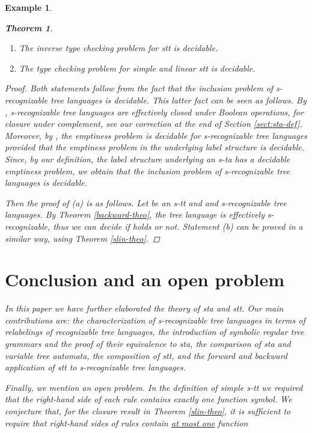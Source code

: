 \documentclass[10pt]{scrartcl}
\newtheorem{ex}[df]{Example}
\newtheorem{theo}[df]{Theorem}
\begin{document}
\begin{ex}
\begin{theo}
\begin{enumerate}
\item[(a)] The inverse type checking problem for stt is decidable.
\item[(b)] The type checking problem for simple and linear stt is decidable. 
\end{enumerate}
\end{theo}
\begin{proof}Both statements follow from the fact that the inclusion problem of s-recognizable tree languages is decidable. This latter fact can be seen as follows. By \cite[Thm. 3]{veabjo11a}, s-recognizable tree languages are effectively closed under Boolean operations, for closure under complement, see our correction at the end of Section \ref{sect:sta-def}. Moreover, by \cite[Thm. 4]{veabjo11a}, the emptiness problem is decidable for s-recognizable tree languages provided that the emptiness problem in the underlying label structure is decidable. Since, by our definition, the label structure underlying an s-ta has a decidable emptiness problem, we obtain that the inclusion problem of s-recognizable tree languages is decidable.

Then the proof of (a) is as follows. Let  be an s-tt and  and  s-recognizable tree languages.  By Theorem \ref{backward-theo},  the tree language   is effectively s-recognizable, thus we can decide if
 holds or not. Statement (b) can be proved in a similar way, using Theorem \ref{slin-theo}.
\end{proof} 





\section{Conclusion and an open problem}


In this paper we have further elaborated the theory of sta and stt. Our main contributions are: the characterization of s-recognizable tree languages in terms of relabelings of recognizable tree languages, the introduction of symbolic regular tree grammars and the proof of their equivalence to sta, the comparison of sta and variable tree automata, the composition of stt, and the forward and backward application of stt to s-recognizable tree languages.

Finally, we  mention an open problem.
In the definition of simple s-tt we required that the right-hand side of each rule contains exactly one function symbol. We conjecture that, for the closure result in Theorem \ref{slin-theo}, it is sufficient to require that right-hand sides of rules contain \underline{at most one} function 




\end{ex}
\end{document}

